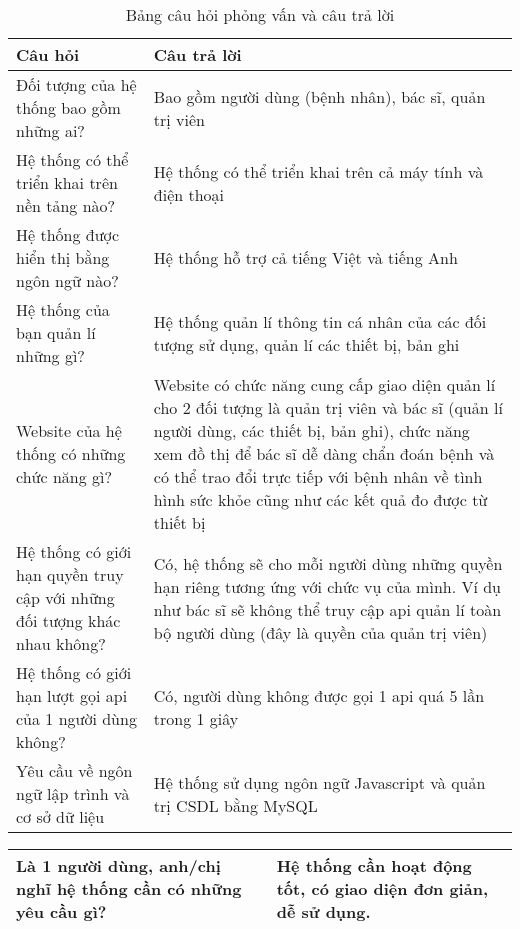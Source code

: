 \begin{table}[H]
    \centering
    \caption{Bảng câu hỏi phỏng vấn và câu trả lời}
    \begin{tabularx}{0.9\textwidth}{
    | >{\raggedright\arraybackslash}X
    | >{\raggedright\arraybackslash}X|
    }
    \hline
    \bfseries Câu hỏi                              &   \bfseries Câu trả lời \\\hline
    Đối tượng của hệ thống bao gồm những ai?       &   Bao gồm người dùng (bệnh nhân), bác sĩ, quản trị viên \\\hline
    Hệ thống có thể triển khai trên nền tảng nào?  &   Hệ thống có thể triển khai trên cả máy tính và điện thoại \\\hline
    Hệ thống được hiển thị bằng ngôn ngữ nào?      &   Hệ thống hỗ trợ cả tiếng Việt và tiếng Anh\\\hline
    Hệ thống của bạn quản lí những gì?             &   Hệ thống quản lí thông tin cá nhân của các đối tượng sử dụng, quản lí các thiết bị, bản ghi \\\hline
    Website của hệ thống có những chức năng gì?    &   Website có chức năng cung cấp giao diện quản lí cho 2 đối tượng là quản trị viên và bác sĩ (quản lí người dùng, các thiết bị, bản ghi), chức năng xem đồ thị để bác sĩ dễ dàng chẩn đoán bệnh và có thể trao đổi trực tiếp với bệnh nhân về tình hình sức khỏe cũng như các kết quả đo được từ thiết bị \\\hline
    Hệ thống có giới hạn quyền truy cập với những đối tượng khác nhau không?   &  Có, hệ thống sẽ cho mỗi người dùng những quyền hạn riêng tương ứng với chức vụ của mình. Ví dụ như bác sĩ sẽ không thể truy cập api quản lí toàn bộ người dùng (đây là quyền của quản trị viên) \\\hline
    Hệ thống có giới hạn lượt gọi api của 1 người dùng không?                  &  Có, người dùng không được gọi 1 api quá 5 lần trong 1 giây \\\hline
    Yêu cầu về ngôn ngữ lập trình và cơ sở dữ liệu &   Hệ thống sử dụng ngôn ngữ Javascript và quản trị CSDL bằng MySQL \\\hline
    \end{tabularx}
\end{table}
\begin{tabularx}{0.9\textwidth}{
    | >{\raggedright\arraybackslash}X
    | >{\raggedright\arraybackslash}X|
    }
    \hline
    Là 1 người dùng, anh/chị nghĩ hệ thống cần có những yêu cầu gì?            &  Hệ thống cần hoạt động tốt, có giao diện đơn giản, dễ sử dụng. \\\hline
\end{tabularx}

